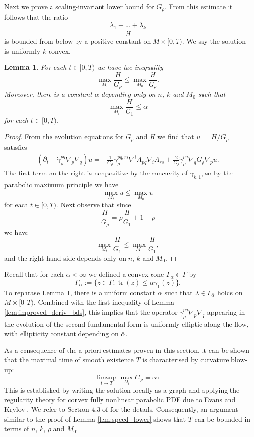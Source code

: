 \documentclass[12pt]{amsart}
\newtheorem{lemma}[theorem]{Lemma}
\DeclareMathOperator{\tr}{tr}
\begin{document}
Next we prove a scaling-invariant lower bound for $G_{\rho}$. From this estimate it follows that the ratio
\[\frac{\lambda_1 + \dots + \lambda_k}{H}\]
is bounded from below by a positive constant on $M\times[0,T)$. We say the solution is uniformly $k$-convex. 

\begin{lemma}
\label{lem:unif_parabolic}
For each $t \in [0,T)$ we have the inequality
\[\max_{M_t} \frac{H}{G_\rho} \leq \max_{M_0} \frac{H}{G_\rho}.\]
Moreover, there is a constant $\bar \alpha$ depending only on $n$, $k$ and $M_0$ such that 
\[ \max_{M_t} \frac{H}{G_1} \leq \bar \alpha \]
for each $t \in [0,T)$.
\end{lemma}
\begin{proof}
From the evolution equations for $G_{\rho}$ and $H$ we find that $u:= H/G_\rho$ satisfies 
\begin{align*}
(\partial_t  -\dot \gamma_{\rho}^{pq} \nabla_p \nabla_q ) u  =&  \frac{1}{G_{\rho}} \ddot \gamma_{\rho}^{pq,rs}\nabla^i A_{pq} \nabla_i A_{rs} + \frac{2}{G_{\rho}} \dot \gamma_{\rho}^{pq} \nabla_q G_{\rho} \nabla_p u.
\end{align*}
The first term on the right is nonpositive by the concavity of $\gamma_{k,1}$, so by the parabolic maximum principle we have 
\[\max_{M_t} u \leq \max_{M_0} u\]
for each $t \in [0,T)$. Next observe that since
\[\frac{H}{G_{\rho}} = \rho \frac{H}{G_{1}} + 1 -\rho \]
we have 
\[\max_{M_t} \frac{H}{G_1} \leq \max_{M_0} \frac{H}{G_1},\]
and the right-hand side depends only on $n$, $k$ and $M_0$.
\end{proof}

Recall that for each $\alpha < \infty$ we defined a convex cone $\Gamma_\alpha \Subset \Gamma$ by
\[\Gamma_\alpha := \{z \in \Gamma : \tr(z) \leq \alpha \gamma_1(z) \}.\]
To rephrase Lemma \ref{lem:unif_parabolic}, there is a uniform constant $\bar \alpha$ such that $\lambda \in \Gamma_{\bar \alpha}$ holds on $M\times[0,T)$. Combined with the first inequality of Lemma \ref{lem:improved_deriv_bds}, this implies that the operator $\dot \gamma_{\rho}^{pq} \nabla_p \nabla_q$ appearing in the evolution of the second fundamental form is uniformly elliptic along the flow, with ellipticity constant depending on $\bar \alpha$. 

As a consequence of the a priori estimates proven in this section, it can be shown that the maximal time of smooth existence $T$ is characterised by curvature blow-up:
\[\limsup_{t \to T} \max_{M_t} G_\rho = \infty.\]
This is established by writing the solution locally as a graph and applying the regularity theory for convex fully nonlinear parabolic PDE due to Evans \cite{Ev82} and Krylov \cite{Kryl82}. We refer to Section 4.3 of \cite{Lang14} for the details. Consequently, an argument similar to the proof of Lemma \ref{lem:speed_lower} shows that $T$ can be bounded in terms of $n$, $k$, $\rho$ and $M_0$. 
\end{document}
